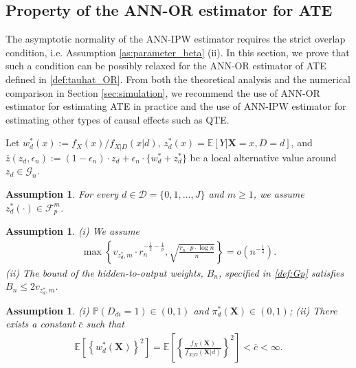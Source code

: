 \documentclass[11pt]{article}
\def\bs{\boldsymbol}
\newtheorem{assumption}[]{Assumption}
\numberwithin{equation}{section}
\begin{document}
\subsection{Property of the ANN-OR estimator for ATE}\label{sec:OR-property}
The asymptotic normality of the ANN-IPW estimator requires the strict overlap condition, i.e. Assumption \ref{as:parameter_beta} (ii). In this section, we prove that such a condition can be possibly relaxed for the ANN-OR estimator of ATE defined in \eqref{def:tauhat_OR}. From both the theoretical analysis and the numerical comparison in Section \ref{sec:simulation}, we recommend the use of ANN-OR estimator for estimating ATE in practice and the use of ANN-IPW estimator for estimating other types of causal effects such as QTE.

Let $w_d^*(x):=f_X(x)/f_{X|D}(x|d)$, $z_d^*(x)=\mathbb{E}[Y|\bs{X}=x,D=d]$, and
$\overline{z}(z_d,\epsilon_n):=(1-\epsilon_n)\cdot z_d+\epsilon_n\cdot \{w_d^*+z_d^*\}$ be a local alternative value around $z_d\in\mathcal{G}_n$.




\begin{assumption}\label{as:z_d*}
		For every $d\in \mathcal{D}=\{0,1,...,J\}$ and  $m\geq 1$, we assume $z _{d}^{\ast }(\cdot )\in \mathcal{F}_p^m$.
\end{assumption}
\begin{assumption}\label{as:rate_rp_or}  (i) We assume
	\begin{align*}
		\max\left\{v_{z_d^*,m}\cdot r_n^{-\frac{1}{2}-\frac{1}{p}},\sqrt{\frac{r_n\cdot p\cdot \log n}{n}}\right\}=o\left(n^{-\frac{1}{4}}\right).
	\end{align*}
 (ii) The bound of the hidden-to-output weights, $B_n$, specified in \eqref{def:Gp} satisfies  $B_n\leq 2v_{z_d^*,m}$.
\end{assumption}


\begin{assumption}\label{as:parameter_beta_OR}  (i) $\mathbb{P}(D_{di}=1)\in(0,1)$ and $\pi_d^*(\boldsymbol{X})\in (0,1)$;
	(ii) There exists a constant $\bar{c}$ such that
	\begin{align*}
		\mathbb{E}\left[\left\{w_d^*(\boldsymbol{X})\right\}^2\right]=\mathbb{E}\left[\left\{\frac{f_X(\boldsymbol{X})}{f_{X|D}(\boldsymbol{X}|d)}\right\}^2\right]<\overline{c}<\infty.
	\end{align*}
\end{assumption}
\end{document}
